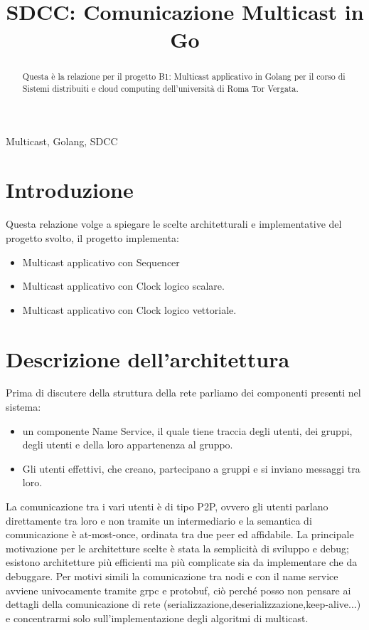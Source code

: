 \documentclass[conference]{IEEEtran}
\begin{document}
\title{SDCC: Comunicazione Multicast in Go}

\author{
}

\maketitle

\begin{abstract}
  Questa è la relazione per il progetto B1: Multicast applicativo in Golang per
  il corso di Sistemi distribuiti e cloud computing dell'università di Roma Tor Vergata.
\end{abstract}

\begin{IEEEkeywords}
Multicast, Golang, SDCC
\end{IEEEkeywords}

\section{Introduzione}
Questa relazione volge a spiegare le scelte architetturali e implementative del
progetto svolto, il progetto implementa:
\begin{itemize}
\item Multicast applicativo con Sequencer
\item Multicast applicativo con Clock logico scalare.
\item Multicast applicativo con Clock logico vettoriale.
\end{itemize}
\section{Descrizione dell'architettura}
Prima di discutere della struttura della rete parliamo dei componenti presenti
nel sistema:
\begin{itemize}
  \item un componente Name Service, il quale tiene traccia degli utenti, dei
    gruppi, degli utenti e della loro appartenenza al gruppo.
    \item Gli utenti effettivi, che creano, partecipano a gruppi e si inviano
      messaggi tra loro.
\end{itemize}
La comunicazione tra i vari utenti è di tipo P2P, ovvero gli utenti parlano
direttamente tra loro e non tramite un intermediario e la semantica di
comunicazione è at-most-once, ordinata tra due peer ed affidabile.
La principale motivazione per le architetture scelte è stata la semplicità di
sviluppo e debug; esistono architetture più efficienti ma più complicate sia da
implementare che da debuggare.
Per motivi simili la comunicazione tra nodi e con il name service avviene
univocamente tramite grpc e protobuf, ciò perché posso non pensare ai dettagli
della comunicazione di rete (serializzazione,deserializzazione,keep-alive...) e
concentrarmi solo sull'implementazione degli algoritmi di multicast.
\end{document}
